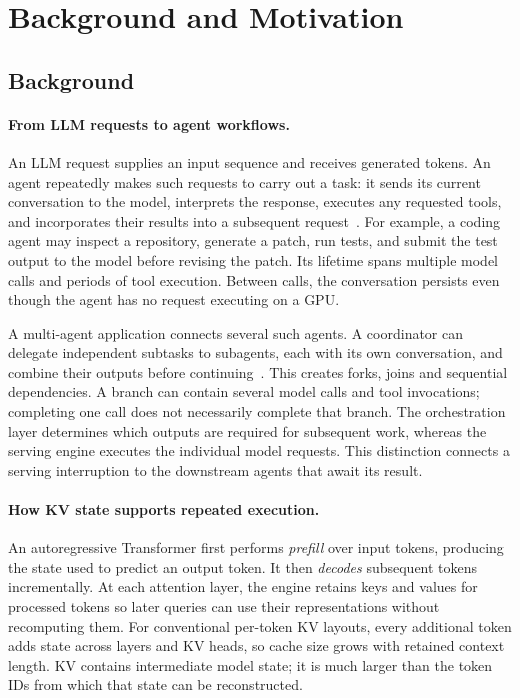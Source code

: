 \section{Background and Motivation}
\label{sec:background-motivation}

\subsection{Background}
\label{sec:motivation-background}

\paragraph{From LLM requests to agent workflows.}
An LLM request supplies an input sequence and receives generated tokens.
An agent repeatedly makes such requests to carry out a task: it sends
its current conversation to the model, interprets the response, executes
any requested tools, and incorporates their results into a subsequent
request~\cite{wu2023autogen}. For example, a coding agent may inspect a
repository, generate a patch, run tests, and submit the test output to
the model before revising the patch. Its lifetime spans multiple model
calls and periods of tool execution. Between calls, the conversation
persists even though the agent has no request executing on a GPU.

A multi-agent application connects several such agents. A coordinator
can delegate independent subtasks to subagents, each with its own
conversation, and combine their outputs before continuing~\cite{anthropic2025multiagent}.
This creates forks, joins and sequential dependencies. A branch can
contain several model calls and tool invocations; completing one call
does not necessarily complete that branch. The orchestration layer
determines which outputs are required for subsequent work, whereas the
serving engine executes the individual model requests. This distinction
connects a serving interruption to the downstream agents that await its
result.

\paragraph{How KV state supports repeated execution.}
An autoregressive Transformer first performs \emph{prefill} over input
tokens, producing the state used to predict an output token. It then
\emph{decodes} subsequent tokens incrementally. At each attention layer,
the engine retains keys and values for processed tokens so later queries
can use their representations without recomputing them. For conventional
per-token KV layouts, every additional token adds state across layers
and KV heads, so cache size grows with retained context length.
KV contains intermediate model state; it is much larger than the token
IDs from which that state can be reconstructed.

